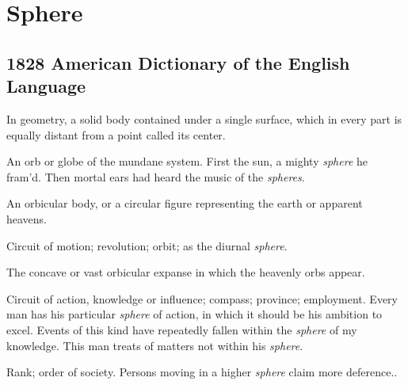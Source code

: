 \section{Sphere}
	\label{SPHERE}
	

\subsection{1828 American Dictionary of the English Language} %
	\label{SPHERE-1828}

	\begin{compactitem}
		\item[1] In geometry, a solid body contained under a single surface, which in every part is equally distant from a point called its center.
		\item[2] An orb or globe of the mundane system. First the sun, a mighty \textit{sphere} he fram'd. Then mortal ears had heard the music of the \textit{spheres}.
		\item[3] An orbicular body, or a circular figure representing the earth or apparent heavens.
		\item[4] Circuit of motion; revolution; orbit; as the diurnal \textit{sphere}.
		\item[5] The concave or vast orbicular expanse in which the heavenly orbs appear.
		\item[6] Circuit of action, knowledge or influence; compass; province; employment. Every man has his particular \textit{sphere} of action, in which it should be his ambition to excel. Events of this kind have repeatedly fallen within the \textit{sphere} of my knowledge. This man treats of matters not within his \textit{sphere}.
		\item[7] Rank; order of society. Persons moving in a higher \textit{sphere} claim more deference..
	\end{compactitem}


